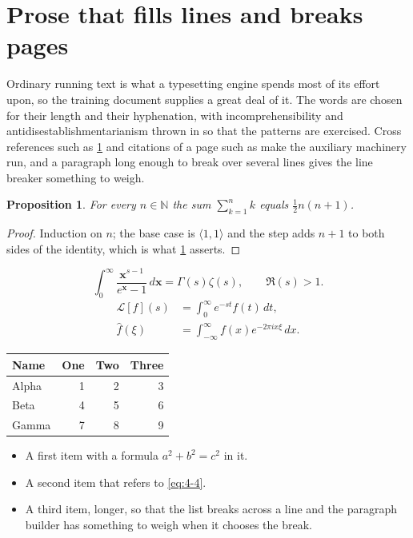 \documentclass[11pt,a4paper]{report}
\theoremstyle{plain}
\newtheorem{proposition}{Proposition}[chapter]
\newcommand{\vecn}[1]{\mathbf{#1}}
\newcommand{\pairs}[2]{\langle #1,#2\rangle}
\begin{document}
\section{Prose that fills lines and breaks pages}
\label{sec:prose4-4}
Ordinary running text is what a typesetting engine spends most of its effort
upon, so the training document supplies a great deal of it. The words are
chosen for their length and their hyphenation, with incomprehensibility and
antidisestablishmentarianism thrown in so that the patterns are exercised.
Cross references such as \cref{sec:prose4-4} and citations of a page such
as \pageref{sec:prose4-4} make the auxiliary machinery run, and a
paragraph long enough to break over several lines gives the line breaker
something to weigh.
\begin{proposition}\label{prop:4-4}
For every $n\in\mathbb{N}$ the sum $\sum_{k=1}^{n}k$ equals
$\tfrac{1}{2}n(n+1)$.
\end{proposition}
\begin{proof}
Induction on $n$; the base case is $\pairs{1}{1}$ and the step adds $n+1$ to
both sides of the identity, which is what \cref{prop:4-4} asserts.
\end{proof}
\begin{equation}\label{eq:4-4}
  \int_{0}^{\infty}\frac{\vecn{x}^{s-1}}{e^{\vecn{x}}-1}\,d\vecn{x}
    = \Gamma(s)\zeta(s),\qquad \Re(s)>1 .
\end{equation}
\begin{align}
  \mathcal{L}[f](s) &= \int_{0}^{\infty} e^{-st} f(t)\,dt, \\
  \widehat{f}(\xi)  &= \int_{-\infty}^{\infty} f(x) e^{-2\pi i x\xi}\,dx .
\end{align}
\par\noindent\begin{center}
\begin{tabular}{lrrr}
\hline
Name & One & Two & Three \\
\hline
Alpha & 1 & 2 & 3 \\
Beta & 4 & 5 & 6 \\
Gamma & 7 & 8 & 9 \\
\hline
\end{tabular}
\end{center}
\begin{itemize}
  \item A first item with a formula $a^2+b^2=c^2$ in it.
  \item A second item that refers to \eqref{eq:4-4}.
  \item A third item, longer, so that the list breaks across a line and the
    paragraph builder has something to weigh when it chooses the break.
\end{itemize}
\end{document}
